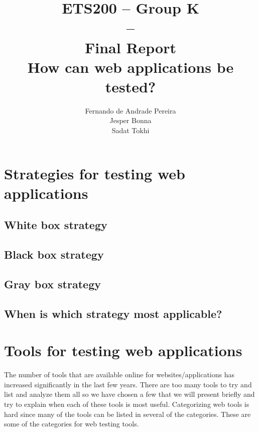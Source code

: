 \documentclass[a4paper]{article}
\title{ETS200 -- Group K\\--\\ Final Report \\
How can web applications be tested?
}
\author{Fernando de Andrade Pereira
\\Jesper Bonna
\\Sadat Tokhi
}
\begin{document}
\maketitle
\thispagestyle{empty}
\clearpage

\tableofcontents
\thispagestyle{empty}
\clearpage

\setcounter{page}{1}

\section{Strategies for testing web applications}

\subsection{White box strategy}

\subsection{Black box strategy}

\subsection{Gray box strategy}

\subsection{When is which strategy most applicable?}

\section{Tools for testing web applications}



 The number of tools that are available online for websites/applications has increased significantly in the last few years. There are too many tools to try and list and analyze them all so we have chosen a few that we will present briefly and try to explain when each of these tools is most useful. 
 Categorizing web tools is hard since many of the tools can be listed in several of the categories. These are some of the categories for web testing tools.  
\end{document}
